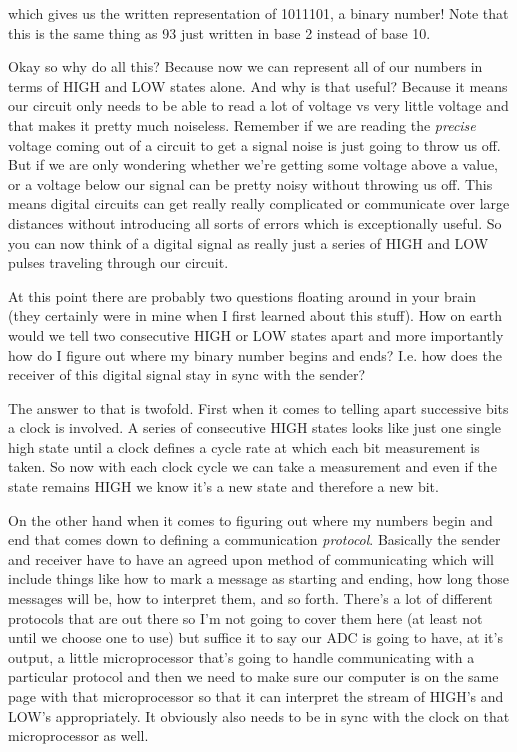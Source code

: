 \documentclass[10pt,a5paper]{book}
\begin{document}
which gives us the written representation of 1011101, a binary number! Note that this is the same thing as 93 just written in base 2 instead of base 10. 

Okay so why do all this? Because now we can represent all of our numbers in terms of HIGH and LOW states alone. And why is that useful? Because it means our circuit only needs to be able to read a lot of voltage vs very little voltage and that makes it pretty much noiseless. Remember if we are reading the \textit{precise} voltage coming out of a circuit to get a signal noise is just going to throw us off. But if we are only wondering whether we're getting some voltage above a value, or a voltage below our signal can be pretty noisy without throwing us off. This means digital circuits can get really really complicated or communicate over large distances without introducing all sorts of errors which is exceptionally useful. So you can now think of a digital signal as really just a series of HIGH and LOW pulses traveling through our circuit.

At this point there are probably two questions floating around in your brain (they certainly were in mine when I first learned about this stuff). How on earth would we tell two consecutive HIGH or LOW states apart and more importantly how do I figure out where my binary number begins and ends? I.e. how does the receiver of this digital signal stay in sync with the sender? 

The answer to that is twofold. First when it comes to telling apart successive bits a clock is involved. A series of consecutive HIGH states looks like just one single high state until a clock defines a cycle rate at which each bit measurement is taken. So now with each clock cycle we can take a measurement and even if the state remains HIGH we know it's a new state and therefore a new bit. 

On the other hand when it comes to figuring out where my numbers begin and end that comes down to defining a communication \textit{protocol}. Basically the sender and receiver have to have an agreed upon method of communicating which will include things like how to mark a message as starting and ending, how long those messages will be, how to interpret them, and so forth. There's a lot of different protocols that are out there so I'm not going to cover them here (at least not until we choose one to use) but suffice it to say our ADC is going to have, at it's output, a little microprocessor that's going to handle communicating with a particular protocol and then we need to make sure our computer is on the same page with that microprocessor so that it can interpret the stream of HIGH's and LOW's appropriately. It obviously also needs to be in sync with the clock on that microprocessor as well. 
\end{document}
